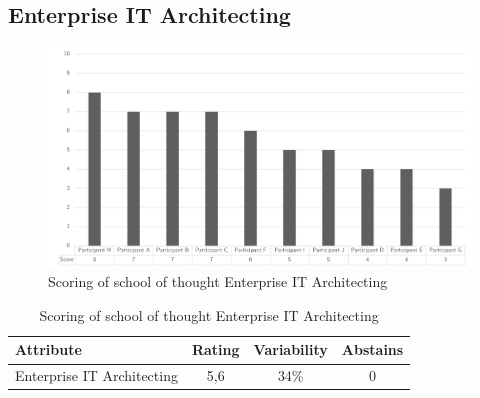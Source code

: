 \subsection{Enterprise IT Architecting}
\begin{figure}[h!]
	\centering
	\includegraphics[width=0.9\linewidth]{images/scoreeaschoolenterpriseitarchitecting}
	\caption[Scoring of school of thought Enterprise IT Architecting]{Scoring of school of thought Enterprise IT Architecting}
	\label{fig:appscoringschoolenterpriseitarchitecting}
\end{figure}
\begin{table}[h!]
	\centering
	\begin{tabular}{p{}ccc}
		\toprule
		\textbf{Attribute} & \textbf{Rating} & \textbf{Variability} & \textbf{Abstains} \\
		\midrule
		Enterprise IT Architecting & 5,6 & 34\% & 0 \\%
		\bottomrule
	\end{tabular}%
	\caption[Scoring of school of thought Enterprise IT Architecting]{Scoring of school of thought Enterprise IT Architecting}
	\label{tab:appscoringschoolenterpriseitarchitecting}%
\end{table}%

\newpage
